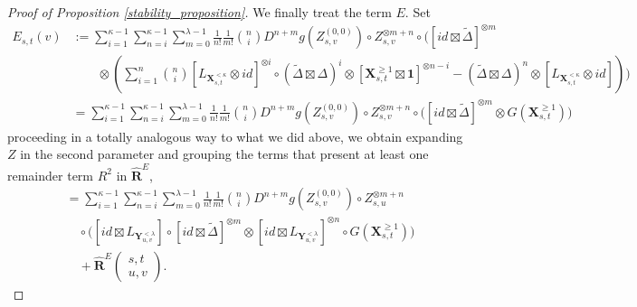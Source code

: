 \documentclass[10pt,a4paper]{amsart}
\begin{document}
\begin{proof}[Proof of Proposition \ref{stability_proposition}]
We finally treat the term $E$. Set
\begin{align*}
E_{s,t}(v)
&:=
\sum_{i = 1}^{\kappa -1} \sum_{n = i}^{\kappa -1} \sum_{m = 0}^{\lambda -1}  \frac{1}{n!} \frac{1}{m!} \binom{n}{i} D^{n+m}g(Z^{(0,0)}_{s,v})\circ Z^{\otimes m + n}_{s,v} \circ \Bigg(  \left[ id \boxtimes \tilde{\Delta}\right]^{\otimes m}   \\
&\qquad \otimes \left(\sum_{i = 1}^{n}\binom{n}{i} [L_{\mathbf{X}^{<\kappa}_{s,t}} \otimes id]^{\otimes i } \circ (\tilde{\Delta} \boxtimes \Delta)^{i}  \otimes \left[\mathbf{X}^{\ge 1}_{s,t} \boxtimes \mathbf{1} \right]^{\otimes n-i} - (\tilde{\Delta} \boxtimes \Delta)^{n}  \otimes [L_{\mathbf{X}^{<\kappa}_{s,t}} \otimes id] \right)\Bigg)\\ 
&= \sum_{i = 1}^{\kappa -1} \sum_{n = i}^{\kappa -1} \sum_{m = 0}^{\lambda -1}  \frac{1}{n!} \frac{1}{m!} \binom{n}{i} D^{n+m}g(Z^{(0,0)}_{s,v})\circ Z^{\otimes m + n}_{s,v} \circ \Bigg(  \left[ id \boxtimes \tilde{\Delta}\right]^{\otimes m} \otimes  G(\mathbf{X}^{\geq 1}_{s,t})\Bigg)
\end{align*}
proceeding in a totally analogous way to what we did above, we obtain expanding $Z$ in the second parameter and grouping the terms that present at least one remainder term $R^2$ in $\hat{\mathbf{R}}^{E}$,
\begin{align*}
&=
\sum_{i=1}^{\kappa-1} \sum_{n=i}^{\kappa-1} \sum_{m=0}^{\lambda-1} 
\frac{1}{n!} \frac{1}{m!} \binom{n}{i}
D^{n+m} g(Z^{(0,0)}_{s,v}) \circ Z^{\otimes m+n}_{s,u} \\
&\quad \circ
\Bigg(
    \left[ id \boxtimes L_{\mathbf{Y}^{<\lambda}_{u,v}} \right]
    \circ \left[ id \boxtimes \tilde{\Delta} \right]^{\otimes m}  \otimes
    \left[ id \boxtimes L_{\mathbf{Y}^{<\lambda}_{u,v}} \right]^{\otimes n}
    \circ G(\mathbf{X}^{\ge 1}_{s,t})
\Bigg) \\
&\quad
+ \hat{\mathbf{R}}^{E} \begin{pmatrix} s,t \\ u,v \end{pmatrix} .
\end{align*}


\end{proof}
\end{document}
